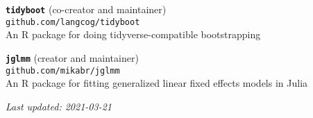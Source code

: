 \documentclass[11pt,]{article}
\begin{document}
\textbf{\texttt{tidyboot}} (co-creator and maintainer)\\
\hspace*{0.333em}\hspace*{0.333em}\hspace*{0.333em}\hspace*{0.333em}\texttt{github.com/langcog/tidyboot}\\
\hspace*{0.333em}\hspace*{0.333em}\hspace*{0.333em}\hspace*{0.333em}An R
package for doing tidyverse-compatible bootstrapping

\textbf{\texttt{jglmm}} (creator and maintainer)\\
\hspace*{0.333em}\hspace*{0.333em}\hspace*{0.333em}\hspace*{0.333em}\texttt{github.com/mikabr/jglmm}\\
\hspace*{0.333em}\hspace*{0.333em}\hspace*{0.333em}\hspace*{0.333em}An R
package for fitting generalized linear fixed effects models in Julia

\centering
\vspace{2em}

\emph{Last updated: 2021-03-21}
\end{document}
